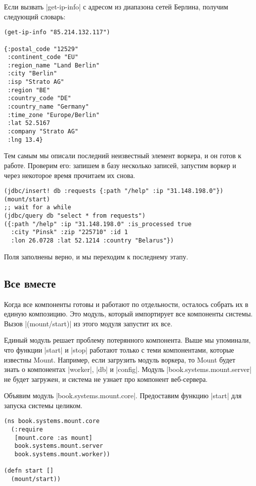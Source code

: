 Если вызвать \spverb|get-ip-info| с адресом из диапазона сетей Берлина, получим
следующий словарь:

\begin{verbatim}
(get-ip-info "85.214.132.117")

{:postal_code "12529"
 :continent_code "EU"
 :region_name "Land Berlin"
 :city "Berlin"
 :isp "Strato AG"
 :region "BE"
 :country_code "DE"
 :country_name "Germany"
 :time_zone "Europe/Berlin"
 :lat 52.5167
 :company "Strato AG"
 :lng 13.4}
\end{verbatim}

Тем самым мы описали последний неизвестный элемент воркера, и он готов к
работе. Проверим его: запишем в базу несколько записей, запустим воркер и через
некоторое время прочитаем их снова.

\begin{verbatim}
(jdbc/insert! db :requests {:path "/help" :ip "31.148.198.0"})
(mount/start)
;; wait for a while
(jdbc/query db "select * from requests")
({:path "/help" :ip "31.148.198.0" :is_processed true
  :city "Pinsk" :zip "225710" :id 1
  :lon 26.0728 :lat 52.1214 :country "Belarus"})
\end{verbatim}

Поля заполнены верно, и мы переходим к последнему этапу.

\subsection{Все вместе}

Когда все компоненты готовы и работают по отдельности, осталось собрать их в
единую композицию. Это модуль, который импортирует все компоненты системы. Вызов
\spverb|(mount/start)| из этого модуля запустит их все.

Единый модуль решает проблему потерянного компонента. Выше мы упоминали, что
функции \spverb|start| и \spverb|stop| работают только с теми компонентами, которые известны
Mount. Например, если загрузить модуль воркера, то Mount будет знать о
компонентах \spverb|worker|, \spverb|db| и \spverb|config|. Модуль \spverb|book.systems.mount.server| не
будет загружен, и система не узнает про компонент веб-сервера.

Объявим модуль \spverb|book.systems.mount.core|. Предоставим функцию \spverb|start| для
запуска системы целиком.

\begin{verbatim}
(ns book.systems.mount.core
  (:require
   [mount.core :as mount]
   book.systems.mount.server
   book.systems.mount.worker))

(defn start []
  (mount/start))
\end{verbatim}

